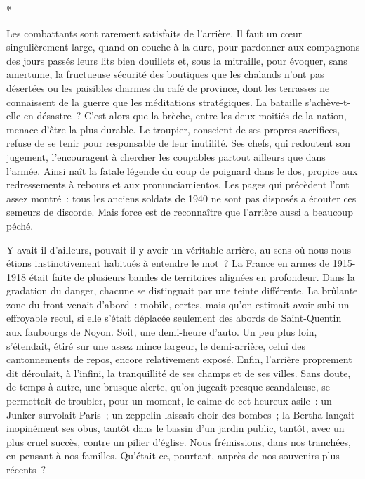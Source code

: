 \documentclass[french,twoside]{book} %
\begin{document}
\begin{center}
*\end{center}
\noindent Les combattants sont rarement satisfaits de l’arrière. Il faut un cœur singulièrement large, quand on couche à la dure, pour pardonner aux compagnons des jours passés leurs lits bien douillets et, sous la mitraille, pour évoquer, sans amertume, la fructueuse sécurité des boutiques que les chalands n’ont pas désertées ou les paisibles charmes du café de province, dont les terrasses ne connaissent de la guerre que les méditations stratégiques. La bataille s’achève-t-elle en désastre ? C’est alors que la brèche, entre les deux moitiés de la nation, menace d’être la plus durable. Le troupier, conscient de ses propres sacrifices, refuse de se tenir pour responsable de leur inutilité. Ses chefs, qui redoutent son jugement, l’encouragent à chercher les coupables partout ailleurs que dans l’armée. Ainsi naît la fatale légende du coup de poignard dans le dos, propice aux redressements à rebours et aux pronunciamientos. Les pages qui précèdent l’ont assez montré : tous les anciens soldats de 1940 ne sont pas disposés a écouter ces semeurs de discorde. Mais force est de reconnaître que l’arrière aussi a beaucoup péché.\par
Y avait-il d’ailleurs, pouvait-il y avoir un véritable arrière, au sens où nous nous étions instinctivement habitués à entendre le mot ? La France en armes de 1915-1918 était faite de plusieurs bandes de territoires alignées en profondeur. Dans la gradation du danger, chacune se distinguait par une   teinte différente. La brûlante zone du front venait d’abord : mobile, certes, mais qu’on estimait avoir subi un effroyable recul, si elle s’était déplacée seulement des abords de Saint-Quentin aux faubourgs de Noyon. Soit, une demi-heure d’auto. Un peu plus loin, s’étendait, étiré sur une assez mince largeur, le demi-arrière, celui des cantonnements de repos, encore relativement exposé. Enfin, l’arrière proprement dit déroulait, à l’infini, la tranquillité de ses champs et de ses villes. Sans doute, de temps à autre, une brusque alerte, qu’on jugeait presque scandaleuse, se permettait de troubler, pour un moment, le calme de cet heureux asile : un Junker survolait Paris ; un zeppelin laissait choir des bombes ; la Bertha lançait inopinément ses obus, tantôt dans le bassin d’un jardin public, tantôt, avec un plus cruel succès, contre un pilier d’église. Nous frémissions, dans nos tranchées, en pensant à nos familles. Qu’était-ce, pourtant, auprès de nos souvenirs plus récents ?\par
\end{document}

